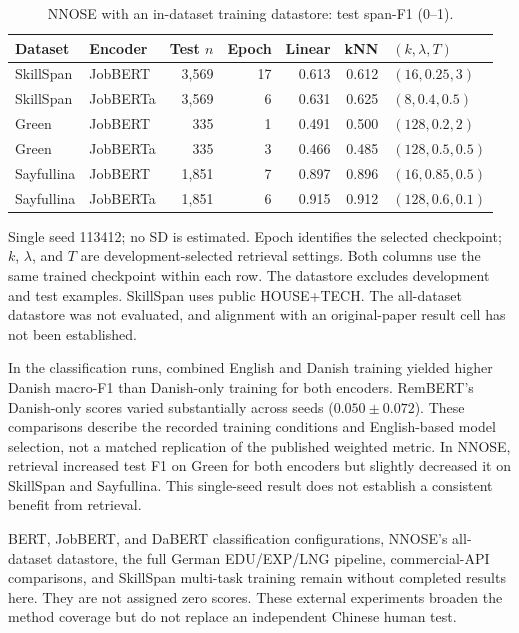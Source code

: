 \begin{table}[htbp]
\centering\small
\caption{NNOSE with an in-dataset training datastore: test span-F1 (0--1).}
\label{tab:external-nnose}
\begin{tabularx}{\linewidth}{@{}L P{.15\linewidth}r r r r P{.19\linewidth}@{}}
\toprule
Dataset & Encoder & Test $n$ & Epoch & Linear & kNN & $(k,\lambda,T)$ \\
\midrule
SkillSpan & JobBERT & 3,569 & 17 & 0.613 & 0.612 & $(16,0.25,3)$ \\
SkillSpan & JobBERTa & 3,569 & 6 & 0.631 & 0.625 & $(8,0.4,0.5)$ \\
Green & JobBERT & 335 & 1 & 0.491 & 0.500 & $(128,0.2,2)$ \\
Green & JobBERTa & 335 & 3 & 0.466 & 0.485 & $(128,0.5,0.5)$ \\
Sayfullina & JobBERT & 1,851 & 7 & 0.897 & 0.896 & $(16,0.85,0.5)$ \\
Sayfullina & JobBERTa & 1,851 & 6 & 0.915 & 0.912 & $(128,0.6,0.1)$ \\
\bottomrule
\end{tabularx}
\par\smallskip\RaggedRight\footnotesize Single seed 113412; no SD is estimated. Epoch identifies the selected checkpoint; $k$, $\lambda$, and $T$ are development-selected retrieval settings. Both columns use the same trained checkpoint within each row. The datastore excludes development and test examples. SkillSpan uses public HOUSE+TECH. The all-dataset datastore was not evaluated, and alignment with an original-paper result cell has not been established.
\end{table}

In the classification runs, combined English and Danish training yielded higher Danish macro-F1 than Danish-only training for both encoders. RemBERT's Danish-only scores varied substantially across seeds ($0.050\pm0.072$). These comparisons describe the recorded training conditions and English-based model selection, not a matched replication of the published weighted metric. In NNOSE, retrieval increased test F1 on Green for both encoders but slightly decreased it on SkillSpan and Sayfullina. This single-seed result does not establish a consistent benefit from retrieval.

BERT, JobBERT, and DaBERT classification configurations, NNOSE's all-dataset datastore, the full German EDU/EXP/LNG pipeline, commercial-API comparisons, and SkillSpan multi-task training remain without completed results here. They are not assigned zero scores. These external experiments broaden the method coverage but do not replace an independent Chinese human test.
